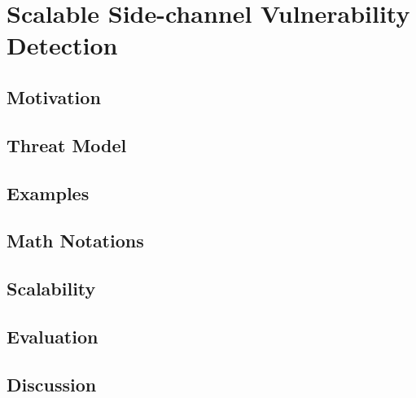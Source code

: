 
\chapter{Scalable Side-channel Vulnerability Detection}
\section{Motivation}


\section{Threat Model}

\section{Examples}

\section{Math Notations}

\section{Scalability}

\section{Evaluation}

\section{Discussion}